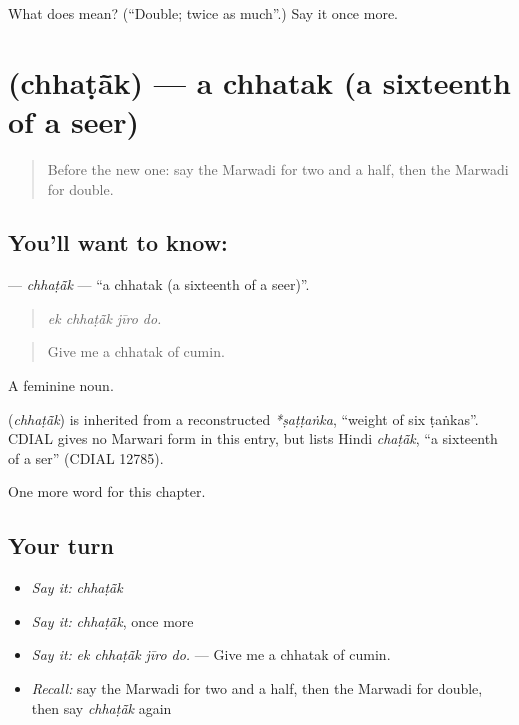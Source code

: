 \begin{tcolorbox}[breakable,colback=teal!4,colframe=teal!35!black,title={Before you move on}]
What does  mean? (\textquotedblleft{}Double; twice as much\textquotedblright{}.) Say it once more.
\end{tcolorbox}
\section[\texorpdfstring{\mw{छटांक} (chhaṭā̃k)}{छटांक (chhaṭā̃k)}]{ (chhaṭā̃k) — a chhatak (a sixteenth of a seer)}

\label{lesson:MW-C212-chhatak}



\begin{quote}
Before the new one: say the Marwadi for two and a half, then the Marwadi for double.
\end{quote}

\subsection*{You'll want to know: }
\textbf{} — \emph{chhaṭā̃k} — \textquotedblleft{}a chhatak (a sixteenth of a seer)\textquotedblright{}.

\begin{quote}
   
\end{quote}

\begin{quote}
\emph{ek chhaṭā̃k jīro do.}
\end{quote}

\begin{quote}
Give me a chhatak of cumin.
\end{quote}

A feminine noun.

\begin{cousinweb}
\textbf{} (\emph{chhaṭā̃k}) is inherited from a reconstructed \emph{*ṣaṭṭaṅka}, \textquotedblleft{}weight of six ṭaṅkas\textquotedblright{}. CDIAL gives no Marwari form in this entry, but lists Hindi \emph{chaṭā̃k}, \textquotedblleft{}a sixteenth of a ser\textquotedblright{} (CDIAL 12785).
\end{cousinweb}

\begin{grammarlens}[title={What you've built}]
One more word for this chapter.
\end{grammarlens}

\subsection*{Your turn}
\begin{itemize}
\raggedright
  \item \emph{Say it:} \emph{chhaṭā̃k}
  \item \emph{Say it:} \emph{chhaṭā̃k}, once more
  \item \emph{Say it:} \emph{ek chhaṭā̃k jīro do.} — Give me a chhatak of cumin.
  \item \emph{Recall:} say the Marwadi for two and a half, then the Marwadi for double, then say \emph{chhaṭā̃k} again
\end{itemize}

